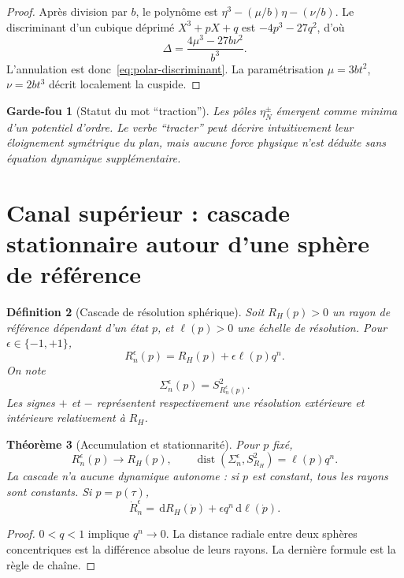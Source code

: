 \documentclass[11pt,a4paper]{article}
\newtheorem{theorem}{Théorème}[section]
\newtheorem{definition}[theorem]{Définition}
\newtheorem{guardrail}[theorem]{Garde-fou}
\newcommand{\dd}{\,\mathrm d}
\newcommand{\dist}{\operatorname{dist}}
\begin{document}
\begin{proof}
Après division par $b$, le polynôme est $\eta^3-(\mu/b)\eta-(\nu/b)$. Le discriminant d'un cubique déprimé $X^3+pX+q$ est $-4p^3-27q^2$, d'où
\[
 \Delta=\frac{4\mu^3-27b\nu^2}{b^3}.
\]
L'annulation est donc~\eqref{eq:polar-discriminant}. La paramétrisation
$\mu=3b t^2$, $\nu=2b t^3$ décrit localement la cuspide.
\end{proof}

\begin{guardrail}[Statut du mot ``traction'']
Les pôles $\eta_N^\pm$ émergent comme minima d'un potentiel d'ordre. Le verbe ``tracter'' peut décrire intuitivement leur éloignement symétrique du plan, mais aucune force physique n'est déduite sans équation dynamique supplémentaire.
\end{guardrail}

\section{Canal supérieur : cascade stationnaire autour d'une sphère de référence}

\begin{definition}[Cascade de résolution sphérique]
Soit $R_H(p)>0$ un rayon de référence dépendant d'un état $p$, et $\ell(p)>0$ une échelle de résolution. Pour $\epsilon\in\{-1,+1\}$,
\begin{equation}\label{eq:Rn}
 R_n^{\epsilon}(p)=R_H(p)+\epsilon\ell(p)q^n.
\end{equation}
On note
\[
 \Sigma_n^\epsilon(p)=S^2_{R_n^\epsilon(p)}.
\]
Les signes $+$ et $-$ représentent respectivement une résolution extérieure et intérieure relativement à $R_H$.
\end{definition}

\begin{theorem}[Accumulation et stationnarité]\label{thm:upperacc}
Pour $p$ fixé,
\[
 R_n^\epsilon(p)\to R_H(p),\qquad
 \dist(\Sigma_n^\epsilon,S^2_{R_H})=\ell(p)q^n.
\]
La cascade n'a aucune dynamique autonome : si $p$ est constant, tous les rayons sont constants. Si $p=p(\tau)$,
\[
 \dot R_n^\epsilon=\dd R_H(\dot p)+\epsilon q^n\dd\ell(\dot p).
\]
\end{theorem}

\begin{proof}
$0<q<1$ implique $q^n\to0$. La distance radiale entre deux sphères concentriques est la différence absolue de leurs rayons. La dernière formule est la règle de chaîne.
\end{proof}
\end{document}
